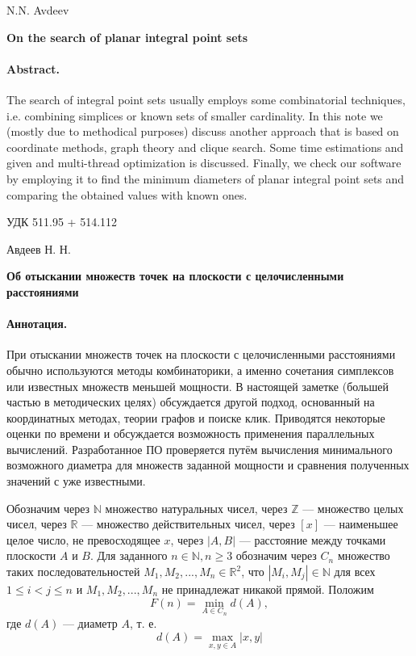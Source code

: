 \documentclass{article}
\begin{document}
N.N. Avdeev
\begin{center}
	\textbf{
		On the search of planar integral point sets
	}
\end{center}


\paragraph{Abstract.}
	The search of integral point sets usually employs some combinatorial techniques,
	i.e. combining simplices or known sets of smaller cardinality.
	In this note we (mostly due to methodical purposes) discuss another approach that is based on coordinate methods,
	graph theory and clique search.
	Some time estimations and given and multi-thread optimization is discussed.
	Finally, we check our software by employing it to find the minimum diameters
	of planar integral point sets and comparing the obtained values with known ones.

\vspace{3em}

УДК 511.95 + 514.112

Авдеев Н. Н.

\begin{center}
	\textbf{
	Об отыскании множеств точек на плоскости с целочисленными расстояниями}
\end{center}

\paragraph{Аннотация.}
	При отыскании множеств точек на плоскости с целочисленными расстояниями обычно используются
	методы комбинаторики, а именно сочетания симплексов или известных множеств меньшей мощности.
	В настоящей заметке (большей частью в методических целях)
	обсуждается другой подход, основанный на координатных методах,
	теории графов и поиске клик.
	Приводятся некоторые оценки по времени и обсуждается возможность применения параллельных вычислений.
	Разработанное ПО проверяется путём вычисления минимального возможного диаметра для множеств
	заданной мощности и сравнения полученных значений с уже известными.

\vspace{6em}


Обозначим через $\mathbb{N}$ множество натуральных чисел, через $\mathbb{Z}$ --- множество целых чисел, через $\mathbb{R}$ --- множество действительных чисел, через $[x]$ --- наименьшее целое число, не превосходящее $x$, через $|A,B|$ --- расстояние между точками плоскости $A$ и $B$.
Для заданного $n\in \mathbb{N}, n\geq 3$ обозначим через $C_n$ множество таких последовательностей $M_1,M_2,...,M_n \in \mathbb{R}^2$, что $|M_i,M_j|\in\mathbb{N}$ для всех $1\leq i < j  \leq n$ и  $M_1,M_2,...,M_n$ не принадлежат никакой прямой.
Положим
$$
F(n)=\min\limits_{A\in C_n} d(A),
$$
где $d(A)$ --- диаметр $A$, т. е.
$$
d(A)=\max\limits_{x,y\in A}|x,y|
$$
\end{document}
